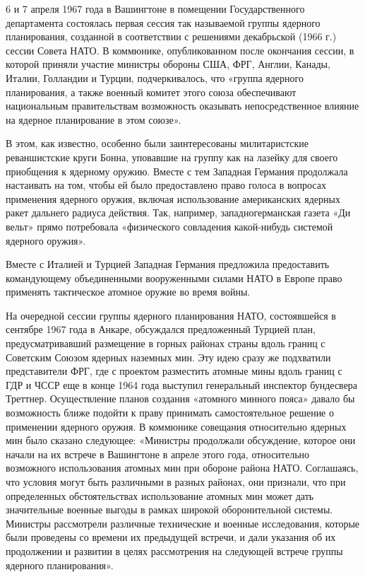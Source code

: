 \documentclass[12pt, a4paper, openany]{book}
\begin{document}
	6 и 7 апреля 1967 года в Вашингтоне в помещении Государственного департамента состоялась первая сессия так называемой группы ядерного планирования, созданной в соответствии с решениями декабрьской (1966 г.) сессии Совета НАТО. В коммюнике, опубликованном после окончания сессии, в которой приняли участие министры обороны США, ФРГ, Англии, Канады, Италии, Голландии и Турции, подчеркивалось, что «группа ядерного планирования, а также военный комитет этого союза обеспечивают национальным правительствам возможность оказывать непосредственное влияние на ядерное планирование в этом союзе».
	
	В этом, как известно, особенно были заинтересованы милитаристские реваншистские круги Бонна, уповавшие на группу как на лазейку для своего приобщения к ядерному оружию. Вместе с тем Западная Германия продолжала настаивать на том, чтобы ей было предоставлено право голоса в вопросах применения ядерного оружия, включая использование американских ядерных ракет дальнего радиуса действия. Так, например, западногерманская газета «Ди вельт» прямо потребовала «физического совладения какой-нибудь системой ядерного оружия».
	
	Вместе с Италией и Турцией Западная Германия предложила предоставить командующему объединенными вооруженными силами НАТО в Европе право применять тактическое атомное оружие во время войны.
	
	На очередной сессии группы ядерного планирования НАТО, состоявшейся в сентябре 1967 года в Анкаре, обсуждался предложенный Турцией план, предусматривавший размещение в горных районах страны вдоль границ с Советским Союзом ядерных наземных мин. Эту идею сразу же подхватили представители ФРГ, где с проектом разместить атомные мины вдоль границ с ГДР и ЧССР еще в конце 1964 года выступил генеральный инспектор бундесвера Треттнер. Осуществление планов создания «атомного минного пояса» давало бы возможность ближе подойти к праву принимать самостоятельное решение о применении ядерного оружия. В коммюнике совещания относительно ядерных мин было сказано следующее: «Министры продолжали обсуждение, которое они начали на их встрече в Вашингтоне в апреле этого года, относительно возможного использования атомных мин при обороне района НАТО. Соглашаясь, что условия могут быть различными в разных районах, они признали, что при определенных обстоятельствах использование атомных мин может дать значительные военные выгоды в рамках широкой оборонительной системы. Министры рассмотрели различные технические и военные исследования, которые были проведены со времени их предыдущей встречи, и дали указания об их продолжении и развитии в целях рассмотрения на следующей встрече группы ядерного планирования».
	
\end{document}
